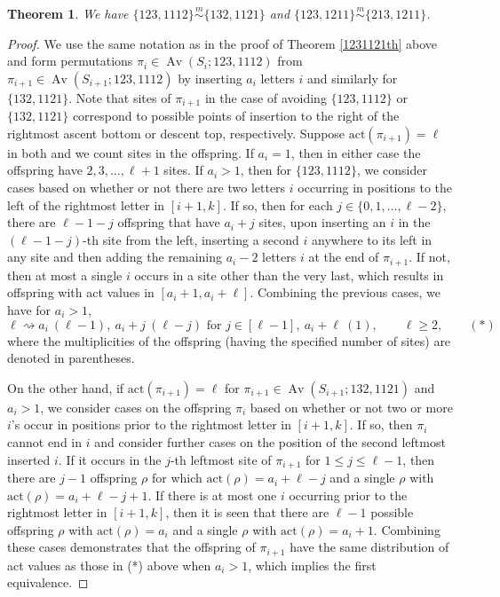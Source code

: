 \documentclass[11pt]{amsart}
\theoremstyle{plain}
\newtheorem{theorem}{Theorem}[section]
\theoremstyle{definition}
\newcommand{\csim}{\stackrel{m}{\sim}}
\DeclareMathOperator{\Av}{Av}
\begin{document}
\begin{theorem}\label{123,1112}
We have $\{123,1112\}\csim\{132,1121\}$ and $\{123,1211\}\csim\{213,1211\}$.
\end{theorem}
\begin{proof}
We use the same notation as in the proof of Theorem \ref{1231121th} above and form permutations
$\pi_i \in \Av(S_i;123,1112)$ from $\pi_{i+1}\in \Av(S_{i+1};123,1112)$ by inserting $a_i$
letters $i$ and similarly for $\{132,1121\}$.  Note that sites of $\pi_{i+1}$ in the case of avoiding
$\{123,1112\}$ or $\{132,1121\}$ correspond to possible points of insertion to the right of the
rightmost ascent bottom or descent top, respectively.  Suppose $\text{act}(\pi_{i+1})=\ell$ in both
and we count sites in the offspring.  If $a_i=1$, then in either case the offspring have
$2,3,\ldots,\ell+1$ sites. If $a_i>1$, then for $\{123,1112\}$, we consider cases based on whether or
not there are two letters $i$ occurring in positions to the left of the rightmost letter in
$[i+1,k]$.  If so, then for each $j \in \{0,1,\ldots,\ell-2\}$, there are $\ell-1-j$ offspring that
have $a_i+j$ sites, upon inserting an $i$ in the $(\ell-1-j)$-th site from the left, inserting a
second $i$ anywhere to its left in any site and then adding the remaining $a_i-2$ letters $i$ at the
end of $\pi_{i+1}$.  If not, then at most a single $i$ occurs in a site other than the very last,
which results in offspring with act values in $[a_i+1,a_i+\ell]$.  Combining the previous cases, we
have for $a_i>1$,
$$\ell\rightsquigarrow a_i~(\ell-1),~a_i+j~(\ell-j) \text{ for } j \in [\ell-1],~a_i+\ell~(1),
\qquad \ell \geq 2,     \qquad(*)$$
where the multiplicities of the offspring (having the specified number of sites) are denoted in
parentheses.

On the other hand, if $\text{act}(\pi_{i+1})=\ell$ for $\pi_{i+1}\in \Av(S_{i+1};132,1121)$ and
$a_i>1$, we consider cases on the offspring $\pi_i$ based on whether or not two or more $i$'s occur
in positions prior to the rightmost letter in $[i+1,k]$.  If so, then $\pi_i$ cannot end in $i$ and
consider further cases on the position of the second leftmost inserted $i$.  If it occurs in the
$j$-th leftmost site of $\pi_{i+1}$ for $1 \leq j \leq \ell-1$, then there are $j-1$ offspring $\rho$
for which $\text{act}(\rho)=a_i+\ell-j$ and a single $\rho$ with $\text{act}(\rho)=a_i+\ell-j+1$.  If
there is at most one $i$ occurring prior to the rightmost letter in $[i+1,k]$, then it is seen that
there are $\ell-1$ possible offspring $\rho$ with $\text{act}(\rho)=a_i$ and a single $\rho$ with
$\text{act}(\rho)=a_i+1$.  Combining these cases demonstrates that the offspring of $\pi_{i+1}$ have
the same distribution of act values as those in (*) above when $a_i>1$, which implies the first
equivalence.


\end{proof}
\end{document}
